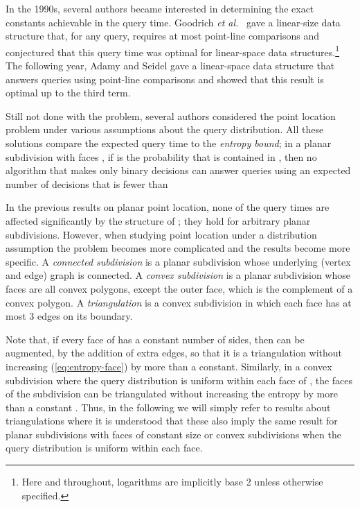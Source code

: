 \documentclass[lotsofwhite]{patmorin}
\newcommand{\eqrefx}[1]{(\ref{eq:#1})}
\newcommand{\etal}{\emph{et al.}}
\begin{document}
In the 1990s, several authors became interested in determining the
exact constants achievable in the query time.  Goodrich \etal\
\cite{gor97} gave a linear-size data structure that, for any query,
requires at most  point-line comparisons and
conjectured that this query time was optimal for linear-space data
structures.\footnote{Here and throughout, logarithms are implicitly base 2
unless otherwise specified.} The following year, Adamy and Seidel
\cite{as98} gave a linear-space data structure that answers queries
using  point-line comparisons
and showed that this result is optimal up to the third term.

Still not done with the problem, several authors considered the point
location problem under various assumptions about the query
distribution.  All these solutions compare the expected query time to
the \emph{entropy bound};  in a planar subdivision  with  faces
, if  is the probability that  is
contained in , then no algorithm that makes only binary decisions
can answer queries using an expected number of decisions that is fewer
than 


In the previous results on planar point location, none of the query
times are affected significantly by the structure of ;  they hold
for arbitrary planar subdivisions.  However, when studying point
location under a distribution assumption the problem becomes more
complicated and the results become more specific.  A \emph{connected
subdivision} is a planar subdivision whose underlying (vertex and
edge) graph is connected.  A \emph{convex subdivision} is a planar
subdivision whose faces are all convex polygons, except the outer
face, which is the complement of a convex polygon.  A
\emph{triangulation} is a convex subdivision in which each face has at
most 3 edges on its boundary.

Note that, if every face of  has a constant number of sides, then
 can be augmented, by the addition of extra edges, so that it is a
triangulation without increasing \eqrefx{entropy-face} by more than a
constant.  Similarly, in a convex subdivision  where the query
distribution  is uniform within each face of , the faces of the
subdivision can be triangulated without increasing the entropy by more
than a constant \cite{amm00}. Thus, in the following we will simply
refer to results about triangulations where it is understood that
these also imply the same result for planar subdivisions with faces of
constant size or convex subdivisions when the query distribution is
uniform within each face.
\end{document}
